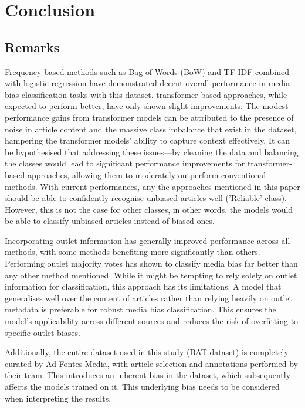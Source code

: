 \chapter{Conclusion}
\label{cha:6}

\section{Remarks}

Frequency-based methods such as Bag-of-Words (BoW) and TF-IDF combined with logistic regression have demonstrated decent overall performance in media bias classification tasks with this dataset. transformer-based approaches, while expected to perform better, have only shown slight improvements. The modest performance gains from transformer models can be attributed to the presence of noise in article content and the massive class imbalance that exist in the dataset, hampering the transformer models' ability to capture context effectively. It can be hypothesised that addressing these issues—by cleaning the data and balancing the classes would lead to significant performance improvements for transformer-based approaches, allowing them to moderately outperform conventional methods. With current performances, any the approaches mentioned in this paper should be able to confidently recognise unbiased articles well ('Reliable' class). However, this is not the case for other classes, in other words, the models would be able to classify unbiased articles instead of biased ones.

Incorporating outlet information has generally improved performance across all methods, with some methods benefiting more significantly than others. Performing outlet majority votes has shown to classify media bias far better than any other method mentioned. While it might be tempting to rely solely on outlet information for classification, this approach has its limitations. A model that generalises well over the content of articles rather than relying heavily on outlet metadata is preferable for robust media bias classification. This ensures the model's applicability across different sources and reduces the risk of overfitting to specific outlet biases.

Additionally, the entire dataset used in this study (BAT dataset) is completely curated by Ad Fontes Media, with article selection and annotations performed by their team. This introduces an inherent bias in the dataset, which subsequently affects the models trained on it. This underlying bias needs to be considered when interpreting the results.

